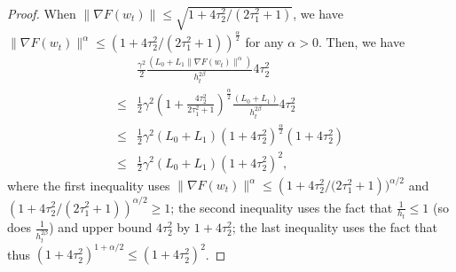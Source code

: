 \documentclass[10pt]{article} %
\newtheorem{proof}{Proof}
\begin{document}
\begin{proof}
        When $\big \|\nabla F(w_t) \big \|\leq \sqrt{1+{4\tau_2^2}/{(2\tau_1^2+1)}}$, we have $\big \|\nabla F(w_t) \big \|^{\alpha}\leq (1+{4\tau_2^2}/{(2\tau_1^2+1)})^{\frac{\alpha}{2}}$ for any $\alpha >0$. Then, we have
        \begin{align}
        &\frac{\gamma^2}{2}\frac{(L_0+L_1\big \|\nabla F(w_t) \big \|^{\alpha})}{h_t^{2\beta}}4\tau_2^2 \nonumber\\
        \leq& \frac{1}{2}\gamma^2(1+\frac{4\tau_2^2}{2\tau_1^2+1})^{\frac{\alpha}{2}}\frac{(L_0+L_1)}{h_t^{2\beta}}{4\tau_2^2}\nonumber \\
        \leq& \frac{1}{2}\gamma^2(L_0+L_1)(1+4\tau_2^2)^{\frac{\alpha}{2}}(1+4\tau_2^2) \nonumber\\
        \leq& \frac{1}{2}\gamma^2(L_0+L_1)(1+{4\tau_2^2})^{2},
        \label{stochastic noise bound 1}
    \end{align}
    where the first inequality uses $\|\nabla F(w_t) \|^{\alpha}\leq (1+{4\tau_2^2}/{(2\tau_1^2+1}))^{\alpha/2}$ and $(1+{4\tau_2^2}/{(2\tau_1^2+1)})^{\alpha/2}\geq1$; the second inequality uses the fact that $\frac{1}{h_t}\leq 1$ (so does $\frac{1}{h_t^{2\beta}}$) and upper bound ${4\tau_2^2}$ by 
    $1+4{\tau_2^2}$; the last inequality uses the fact that thus $(1+4{\tau_2^2})^{1+\alpha/2}\leq(1+4{\tau_2^2})^2 $.


\end{proof}
\end{document}
